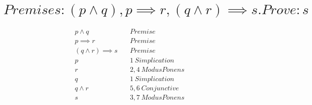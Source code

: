 \documentclass{article}
\begin{document}
\break

{\small
\section{$Premises: (p \land q), p \implies r, (q \land r) \implies s. Prove: s$}
}
\begin{align}
	&p \land q \quad & Premise \\
	&p \implies r \quad & Premise \\
	&(q \land r) \implies s \quad & Premise \\
	&p \quad & 1 \ Simplication \\
	&r \quad & 2,4 \ Modus Ponens \\
	&q \quad & 1 \ Simplication \\
	&q \land r \quad & 5,6 \ Conjunctive \\
	&s \quad & 3,7 \ Modus Ponens
\end{align}
\end{document}
